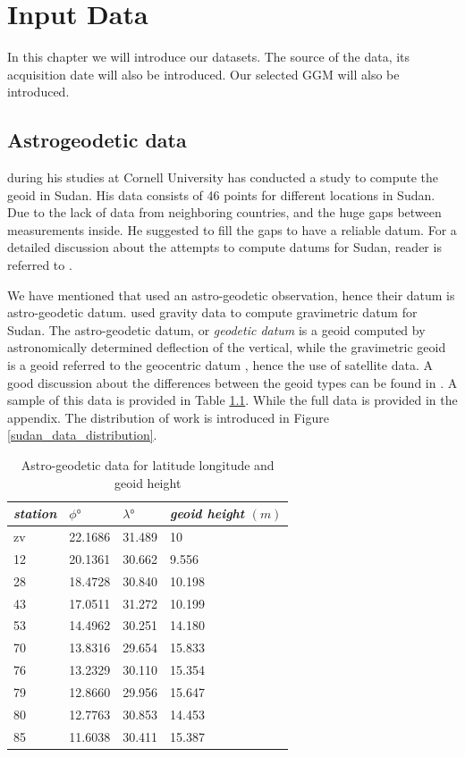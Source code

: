 \chapter{Input Data}

In this chapter we will introduce our datasets. The source of the data, its acquisition date will also be introduced. Our selected GGM will also be introduced.

\section{Astrogeodetic data}

\cite{osman} during his studies at Cornell University has conducted a study to compute the geoid in Sudan. His data consists of 46 points for different locations in Sudan. Due to the lack of data from neighboring countries, and the huge gaps between measurements inside. He suggested to fill the gaps to have a reliable datum. For a detailed discussion about the attempts to compute datums for Sudan, reader is referred to \citep{ahmed_similar}. 

We have mentioned that \citet{osman} used an astro-geodetic observation, hence their datum is astro-geodetic datum. \citet{ahmed_msc} used gravity data to compute gravimetric datum for Sudan. The astro-geodetic datum, or \emph{geodetic datum} is a geoid computed by astronomically determined deflection of the vertical, while the gravimetric geoid is a geoid referred to the geocentric datum \cite{vanicek}, hence the use of satellite data. A good discussion about the differences between the geoid types can be found in \cite{vanicek}. A sample of this data is provided in Table \ref{table:sudan_astro_data}. While the full data is provided in the appendix. The distribution of \citep{osman} work is introduced in Figure \ref{sudan_data_distribution}. 

\begin{table}[]
	\centering
	\caption{Astro-geodetic data for latitude longitude and geoid height}
	\label{table:sudan_astro_data}
		\begin{tabular}{@{}llll@{}}
			\toprule
			\emph{station} & $\phi \si{\degree}$  & $\lambda \si{\degree}$ & \emph{geoid height} $(m)$\\ \midrule
			
			zv & 22.1686 & 31.489 & 10\\
			12 & 20.1361 & 30.662 & 9.556\\
			28 & 18.4728 & 30.840 & 10.198\\
			43 & 17.0511 & 31.272 & 10.199\\
			53 & 14.4962 & 30.251 & 14.180\\
			70 & 13.8316 & 29.654 & 15.833\\
			76 & 13.2329 & 30.110 & 15.354\\
			79 &12.8660 & 29.956 & 15.647\\
			80 &12.7763 & 30.853 & 14.453\\
			85 &11.6038 & 30.411 & 15.387\\ \bottomrule
			
		\end{tabular}
\end{table}


